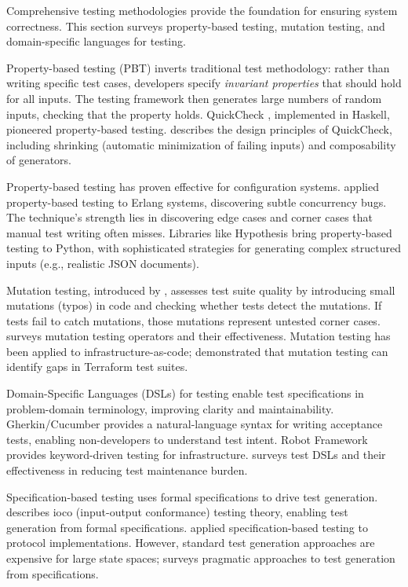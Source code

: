 Comprehensive testing methodologies provide the foundation for ensuring system correctness. This section surveys property-based testing, mutation testing, and domain-specific languages for testing.

Property-based testing (PBT) inverts traditional test methodology: rather than writing specific test cases, developers specify \emph{invariant properties} that should hold for all inputs. The testing framework then generates large numbers of random inputs, checking that the property holds. QuickCheck \citep{Claessen2000}, implemented in Haskell, pioneered property-based testing. \citet{Hughes2016} describes the design principles of QuickCheck, including shrinking (automatic minimization of failing inputs) and composability of generators.

Property-based testing has proven effective for configuration systems. \citet{Arts2018} applied property-based testing to Erlang systems, discovering subtle concurrency bugs. The technique's strength lies in discovering edge cases and corner cases that manual test writing often misses. Libraries like Hypothesis \citep{MacIver2019} bring property-based testing to Python, with sophisticated strategies for generating complex structured inputs (e.g., realistic JSON documents).

Mutation testing, introduced by \citet{DeMillo1978}, assesses test suite quality by introducing small mutations (typos) in code and checking whether tests detect the mutations. If tests fail to catch mutations, those mutations represent untested corner cases. \citet{Jia2010} surveys mutation testing operators and their effectiveness. Mutation testing has been applied to infrastructure-as-code; \citet{Sharma2018} demonstrated that mutation testing can identify gaps in Terraform test suites.

Domain-Specific Languages (DSLs) for testing enable test specifications in problem-domain terminology, improving clarity and maintainability. Gherkin/Cucumber \citep{Wynne2012} provides a natural-language syntax for writing acceptance tests, enabling non-developers to understand test intent. Robot Framework \citep{Harkonen2014} provides keyword-driven testing for infrastructure. \citet{Hutchins2001} surveys test DSLs and their effectiveness in reducing test maintenance burden.

Specification-based testing uses formal specifications to drive test generation. \citet{Tretmans1996} describes ioco (input-output conformance) testing theory, enabling test generation from formal specifications. \citet{Frantzen2005} applied specification-based testing to protocol implementations. However, standard test generation approaches are expensive for large state spaces; \citet{Whittle2012} surveys pragmatic approaches to test generation from specifications.

